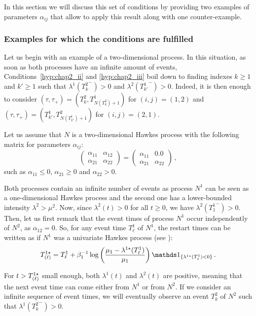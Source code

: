     In this section we will discuss this set of conditions by providing two examples of parameters $\alpha_{ij}$ that allow to apply this result along with one counter-example.

\subsubsection{Examples for which the conditions are fulfilled}
    Let us begin with an example of a two-dimensional process.
    In this situation, as soon as both processes have an infinite amount of events,
    Conditions~\ref{hyp:chap2_ii} and \ref{hyp:chap2_iii} boil down to finding indexes \(k\ge1\) and \(k'\ge1\) such that \(\lambda^1({T_k^2}^-)>0\) and \(\lambda^2({T_{k'}^1}^-)>0\).
    Indeed, it is then enough to consider \((\tau, \tau_+) = (T_k^2, T_{N(T_k^2)+1}^1)\) for \((i, j)=(1, 2)\) and \((\tau, \tau_+) = (T_{k'}^1, T_{N(T_{k'}^1)+1}^2)\) for \((i, j)=(2, 1)\).

    \begin{example}\label{ex:chap2_2dim_identifiability}
        Let us assume that $N$ is a two-dimensional Hawkes process with the following matrix for parameters $\alpha_{ij}$:
        \[\begin{pmatrix}
                      \alpha_{11} & \alpha_{12}\\
                      \alpha_{21} & \alpha_{22}
                      \end{pmatrix}=
                      \begin{pmatrix}
                      \alpha_{11} & 0.0\\
                      \alpha_{21} & \alpha_{22}
                      \end{pmatrix}\,,\]
        such as $\alpha_{11} \leq 0$, $\alpha_{21} \geq 0$ and $\alpha_{22} > 0$.

        Both processes contain an infinite number of events as process $N^1$ can be seen as a one-dimensional Hawkes process and the second one has a lower-bounded intensity $\lambda^2 > \mu^2$.
        Now, since \(\lambda^2(t)>0\) for all \(t\ge0\), we have \(\lambda^2({T_1^1}^-)>0\).
        Then, let us first remark that the event times of process $N^1$ occur independently of $N^2$, as $\alpha_{12} = 0$.
        So, for
        any event time $T_{\ell}^1$ of $N^1$, the restart times can be written as if $N^1$ was a univariate Hawkes process (see \textcite{bonnet2021}):
\[T\park[\ell]^{1\star} = T_\ell^1 + \beta_1^{-1}\log\left(  \frac{\mu_1 - \lambda^{1\star}(T_\ell^1)}{\mu_1}  \right)\II_{\{\lambda^{1\star}(T_\ell^1) < 0\}}\,.\]

        For $t > T\park[\ell]^{1\star}$ small enough, both $\lambda^1(t)$ and $\lambda^2(t)$ are positive,
        meaning that the next event time can come either from \(N^1\) or from \(N^2\).
        If we consider an infinite sequence of event times, we will eventually observe an event \(T_k^2\) of $N^2$ such that $\lambda^1({T_k^2}^-)>0$.
       
    \end{example}

